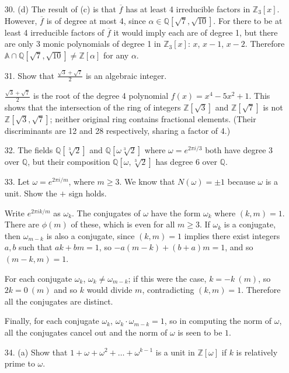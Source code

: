 \documentclass{article}
\newcommand{\w}[0]{\omega}
\newcommand{\Q}[0]{\mathbb{Q}}
\newcommand{\Z}[0]{\mathbb{Z}}
\begin{document}
\begin{enumerate}
\item[30. (d)] The result of (c) is that $\overline{f}$ has at least 4 irreducible factors in $\Z_3[x]$.  However, $\overline{f}$ is of degree at most 4, since $\alpha \in \Q[\sqrt{7}, \sqrt{10}]$.  For there to be at least 4 irreducible factors of $\overline{f}$ it would imply each are of degree 1, but there are only 3 monic polynomials of degree 1 in $\Z_3[x]$: $x$, $x - 1$, $x - 2$.  Therefore $\mathbb{A} \cap \Q[\sqrt{7}, \sqrt{10}] \neq \Z[\alpha]$ for any $\alpha$.

\item[31.] Show that $\frac{\sqrt{3} + \sqrt{7}}{2}$ is an algebraic integer.

$\frac{\sqrt{3} + \sqrt{7}}{2}$ is the root of the degree 4 polynomial $f(x) = x^4 - 5x^2 + 1$.  This shows that the intersection of the ring of integers $\Z[\sqrt{3}]$ and $\Z[\sqrt{7}]$ is not $\Z[\sqrt{3}, \sqrt{7}]$; neither original ring contains fractional elements.  (Their discriminants are 12 and 28 respectively, sharing a factor of 4.)

\item[32.] The fields $\Q[\sqrt[3]{2}]$ and $\Q[\w\sqrt[3]{2}]$ where $\w = e^{2\pi i/3}$ both have degree 3 over $\Q$, but their composition $\Q[\w, \sqrt[3]{2}]$ has degree 6 over $\Q$.

\item[33.] Let $\w = e^{2\pi i / m}$, where $m \ge 3$.  We know that $N(\w) = \pm 1$ because $\w$ is a unit.  Show the $+$ sign holds.

Write $e^{2\pi i k /m}$ as $\w_k$.  The conjugates of $\w$ have the form $\w_k$ where $(k, m) = 1$.  There are $\phi(m)$ of these, which is even for all $m \ge 3$.  If $\w_k$ is a conjugate, then $\w_{m - k}$ is also a conjugate, since $(k, m) = 1$ implies there exist integers $a, b$ such that $ak + bm = 1$, so $-a(m - k) + (b + a)m = 1$, and so $(m - k, m) = 1$.

For each conjugate $\w_k$, $\w_k \ne \w_{m - k}$; if this were the case, $k = -k \ (m)$, so $2k = 0 \ (m)$ and so $k$ would divide $m$, contradicting $(k, m) = 1$.  Therefore all the conjugates are distinct.

Finally, for each conjugate $\w_{k}$, $\w_k \cdot \w_{m - k} = 1$, so in computing the norm of $\w$, all the conjugates cancel out and the norm of $\w$ is seen to be $1$.

\item[34. (a)] Show that $1 + \w + \w^2 + \ldots + \w^{k - 1}$ is a unit in $\Z[\w]$ if $k$ is relatively prime to $\w$.


\end{enumerate}
\end{document}
